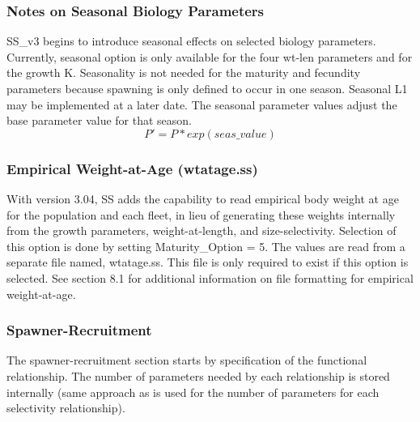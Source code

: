 \hypertarget{SeasGrowth}{}
\subsubsection{Notes on Seasonal Biology Parameters}
SS\_v3 begins to introduce seasonal effects on selected biology parameters.  Currently, seasonal option is only available for the four wt-len parameters and for the growth K.  Seasonality is not needed for the maturity and fecundity parameters because spawning is only defined to occur in one season.  Seasonal L1 may be implemented at a later date.  The seasonal parameter values adjust the base parameter value for that season.
\begin{equation}
P'=P*exp(seas\_value)
\end{equation}

\hypertarget{WAA}{}
\subsubsection{Empirical Weight-at-Age (wtatage.ss)}
With version 3.04, SS adds the capability to read empirical body weight at age for the population and each fleet, in lieu of generating these weights internally from the growth parameters, weight-at-length, and size-selectivity.  Selection of this option is done by setting Maturity\_Option = 5.  The values are read from a separate file named, wtatage.ss.  This file is only required to exist if this option is selected.  See section 8.1 for additional information on file formatting for empirical weight-at-age.

\subsubsection{Spawner-Recruitment}
The spawner-recruitment section starts by specification of the functional relationship.  The number of parameters needed by each relationship is stored internally (same approach as is used for the number of parameters for each selectivity relationship).

